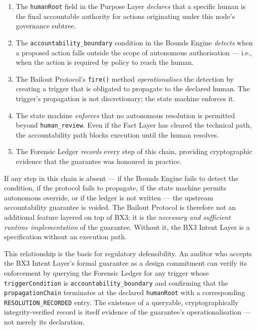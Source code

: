 \documentclass[12pt]{article}
\begin{document}
\begin{enumerate}
  \item The \texttt{humanRoot} field in the Purpose Layer \emph{declares} that a specific human is the final accountable authority for actions originating under this node's governance subtree.
  \item The \texttt{accountability\_boundary} condition in the Bounds Engine \emph{detects} when a proposed action falls outside the scope of autonomous authorisation --- i.e., when the action is required by policy to reach the human.
  \item The Bailout Protocol's \texttt{fire()} method \emph{operationalises} the detection by creating a trigger that is obligated to propagate to the declared human. The trigger's propagation is not discretionary; the state machine enforces it.
  \item The state machine \emph{enforces} that no autonomous resolution is permitted beyond \texttt{human\_review}. Even if the Fact Layer has cleared the technical path, the accountability path blocks execution until the human resolves.
  \item The Forensic Ledger \emph{records} every step of this chain, providing cryptographic evidence that the guarantee was honoured in practice.
\end{enumerate}

If any step in this chain is absent --- if the Bounds Engine fails to detect the condition, if the protocol fails to propagate, if the state machine permits autonomous override, or if the ledger is not written --- the upstream accountability guarantee is voided. The Bailout Protocol is therefore not an additional feature layered on top of BX3; it is the \emph{necessary and sufficient runtime implementation} of the guarantee. Without it, the BX3 Intent Layer is a specification without an execution path.

This relationship is the basis for regulatory defensibility. An auditor who accepts the BX3 Intent Layer's formal guarantee as a design commitment can verify its enforcement by querying the Forensic Ledger for any trigger whose \texttt{triggerCondition} is \texttt{accountability\_boundary} and confirming that the \texttt{propagationChain} terminates at the declared \texttt{humanRoot} with a corresponding \texttt{RESOLUTION\_RECORDED} entry. The existence of a queryable, cryptographically integrity-verified record is itself evidence of the guarantee's operationalisation --- not merely its declaration.
\end{document}

